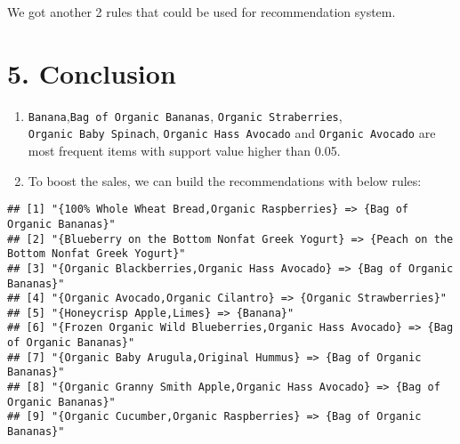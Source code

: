 \documentclass[]{article}
\newenvironment{Shaded}{\begin{snugshade}}{\end{snugshade}}
\newcommand{\CommentTok}[1]{\textcolor[rgb]{0.56,0.35,0.01}{\textit{#1}}}
\newcommand{\DecValTok}[1]{\textcolor[rgb]{0.00,0.00,0.81}{#1}}
\newcommand{\KeywordTok}[1]{\textcolor[rgb]{0.13,0.29,0.53}{\textbf{#1}}}
\newcommand{\NormalTok}[1]{#1}
\newcommand{\OperatorTok}[1]{\textcolor[rgb]{0.81,0.36,0.00}{\textbf{#1}}}
\newcommand{\StringTok}[1]{\textcolor[rgb]{0.31,0.60,0.02}{#1}}
\begin{document}
We got another 2 rules that could be used for recommendation system.

\begin{Shaded}
\end{Shaded}

\hypertarget{conclusion}{%
\section{5. Conclusion}\label{conclusion}}

\begin{enumerate}
\def\labelenumi{\arabic{enumi}.}
\item
  \texttt{Banana},\texttt{Bag\ of\ Organic\ Bananas},
  \texttt{Organic\ Straberries}, \texttt{Organic\ Baby\ Spinach},
  \texttt{Organic\ Hass\ Avocado} and \texttt{Organic\ Avocado} are most
  frequent items with support value higher than 0.05.
\item
  To boost the sales, we can build the recommendations with below rules:
\end{enumerate}

\begin{verbatim}
## [1] "{100% Whole Wheat Bread,Organic Raspberries} => {Bag of Organic Bananas}"                  
## [2] "{Blueberry on the Bottom Nonfat Greek Yogurt} => {Peach on the Bottom Nonfat Greek Yogurt}"
## [3] "{Organic Blackberries,Organic Hass Avocado} => {Bag of Organic Bananas}"                   
## [4] "{Organic Avocado,Organic Cilantro} => {Organic Strawberries}"                              
## [5] "{Honeycrisp Apple,Limes} => {Banana}"                                                      
## [6] "{Frozen Organic Wild Blueberries,Organic Hass Avocado} => {Bag of Organic Bananas}"        
## [7] "{Organic Baby Arugula,Original Hummus} => {Bag of Organic Bananas}"                        
## [8] "{Organic Granny Smith Apple,Organic Hass Avocado} => {Bag of Organic Bananas}"             
## [9] "{Organic Cucumber,Organic Raspberries} => {Bag of Organic Bananas}"
\end{verbatim}
\end{document}
